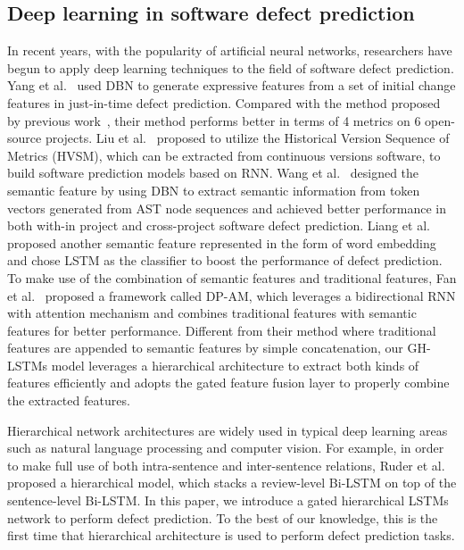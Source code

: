 \documentclass[journal]{IEEEtran}
\begin{document}

\subsection{Deep learning in software defect prediction}
In recent years, with the popularity of artificial neural networks, researchers have begun to apply deep learning techniques to the field of software defect prediction. Yang et al.~\cite{yang2015deep} used DBN to generate expressive features from a set of initial change features in just-in-time defect prediction. Compared with the method proposed by previous work~\cite{kamei2007effects}, their method performs better in terms of 4 metrics on 6 open-source projects. Liu et al.~\cite{liu2018connecting} proposed to utilize the Historical Version Sequence of Metrics (HVSM), which can be extracted from continuous versions software, to build software prediction models based on RNN. Wang et al.~\cite{wang2018deep} designed the semantic feature by using DBN to extract semantic information from token vectors generated from AST node sequences and achieved better performance in both with-in project and cross-project software defect prediction. Liang et al.~\cite{liang2019seml} proposed another semantic feature represented in the form of word embedding and chose LSTM as the classifier to boost the performance of defect prediction. To make use of the combination of semantic features and traditional features, Fan et al.~\cite{fan2019deep} proposed a framework called DP-AM, which leverages a bidirectional RNN with attention mechanism and combines traditional features with semantic features for better performance. Different from their method where traditional features are appended to semantic features by simple concatenation, our GH-LSTMs model leverages a hierarchical architecture to extract both kinds of features efficiently and adopts the gated feature fusion layer to properly combine the extracted features.


Hierarchical network architectures are widely used in typical deep learning areas such as natural language processing and computer vision. For example, in order to make full use of both intra-sentence and inter-sentence relations, Ruder et al. proposed a hierarchical model, which stacks a review-level Bi-LSTM on top of the sentence-level Bi-LSTM. In this paper, we introduce a gated hierarchical LSTMs network to perform defect prediction. To the best of our knowledge, this is the first time that hierarchical architecture is used to perform defect prediction tasks.
\end{document}
